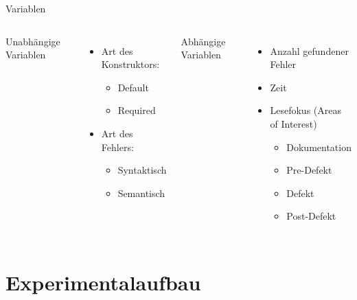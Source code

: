 \documentclass[10pt]{beamer}
\begin{document}
	\begin{frame}{Variablen}
		\begin{columns}[T,onlytextwidth]
	
			Unabhängige Variablen
			\begin{itemize}
				\item Art des Konstruktors:
				\begin{itemize}
					\item Default
					\item Required
				\end{itemize}
				\item Art des Fehlers:
				\begin{itemize}
					\item Syntaktisch
					\item Semantisch
				\end{itemize}
			\end{itemize}			
		
			Abhängige Variablen
			\begin{itemize}
				\item Anzahl gefundener Fehler
				\item Zeit
				\item Lesefokus (Areas of Interest)
				\begin{itemize}
					\item Dokumentation
					\item Pre-Defekt
					\item Defekt
					\item Post-Defekt
				\end{itemize}
			\end{itemize}
			
		\end{columns}	
	\end{frame}

\section{Experimentalaufbau}
\end{document}
